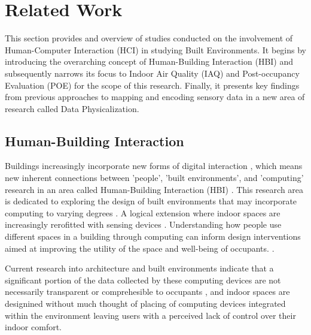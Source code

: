 \section{Related Work}
\label{sec:related_work}

This section provides and overview of studies conducted on the involvement of Human-Computer Interaction (HCI) in studying Built Environments. It begins by introducing the overarching concept of Human-Building Interaction (HBI) and subsequently narrows its focus to Indoor Air Quality (IAQ) and Post-occupancy Evaluation (POE) for the scope of this research. Finally, it presents key findings from previous approaches to mapping and encoding sensory data in a new area of research called Data Physicalization.

\subsection{Human-Building Interaction}

Buildings increasingly incorporate new forms of digital interaction \cite{pulsipher_towards_2023, margariti_understanding_2023}, which means new inherent connections between 'people', 'built environments', and 'computing' research in an area called Human-Building Interaction (HBI) \cite{alavi_introduction_2019, taherkhani_human-building_2023}. This research area is dedicated to exploring the design of built environments that may incorporate computing to varying degrees \cite{sowles_introducing_2021}.  A logical extension where indoor spaces are increasingly rerofitted with sensing devices \cite{}. Understanding how people use different spaces in a building through computing can inform design interventions aimed at improving the utility of the space and well-being of occupants. \cite{verma_studying_2017}. 

Current research into architecture and built environments indicate that a significant portion of the data collected by these computing devices are not necessarily transparent or comprehesible to occupants \cite{schnadelbach_adaptive_2019}, and indoor spaces are designined without much thought of placing of computing devices integrated within the environment \cite{johansen_temporal_2019, kirsh_architects_2019} leaving users with a perceived lack of control over their indoor comfort. 

